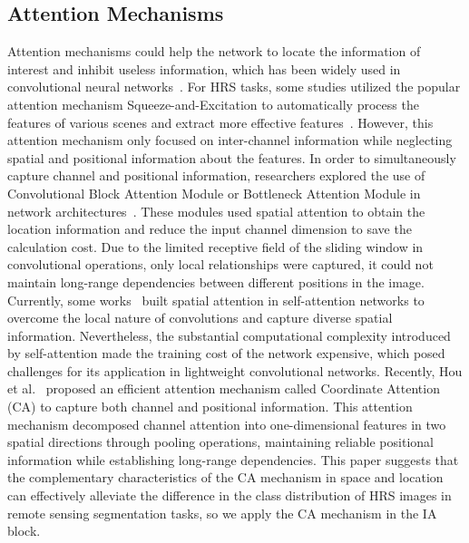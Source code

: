 \documentclass[journal]{IEEEtran}
\begin{document}
\subsection{Attention Mechanisms}
Attention mechanisms could help the network to locate the information of interest and inhibit useless information, which has been widely used in convolutional neural networks~\cite{hu2018squeeze,cao2019gcnet,fu2019dual,liu2020improving,woo2018cbam,chen2021remote}. For HRS tasks, some studies utilized the popular attention mechanism Squeeze-and-Excitation to automatically process the features of various scenes and extract more effective features~\cite{tian2021semsdnet,zhang2022mrse,zhang2022transformer,ding2020lanet,lin2020road}. However, this attention mechanism only focused on inter-channel information while neglecting spatial and positional information about the features. In order to simultaneously capture channel and positional information, researchers explored the use of Convolutional Block Attention Module or Bottleneck Attention Module in network architectures~\cite{wang2022cbam,zhu2021improving,shi2021deeply}. These modules used spatial attention to obtain the location information and reduce the input channel dimension to save the calculation cost. Due to the limited receptive field of the sliding window in convolutional operations, only local relationships were captured, it could not maintain long-range dependencies between different positions in the image. Currently, some works~\cite{wang2022unetformer,strudel2021segmenter,xie2021segformer} built spatial attention in self-attention networks to overcome the local nature of convolutions and capture diverse spatial information. Nevertheless, the substantial computational complexity introduced by self-attention made the training cost of the network expensive, which posed challenges for its application in lightweight convolutional networks. Recently, Hou et al.~\cite{hou2021coordinate} proposed an efficient attention mechanism called Coordinate Attention (CA) to capture both channel and positional information. This attention mechanism decomposed channel attention into one-dimensional features in two spatial directions through pooling operations, maintaining reliable positional information while establishing long-range dependencies. This paper suggests that the complementary characteristics of the CA mechanism in space and location can effectively alleviate the difference in the class distribution of HRS images in remote sensing segmentation tasks, so we apply the CA mechanism in the IA block.
\end{document}
